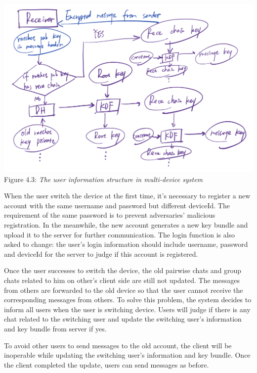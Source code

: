 \begin{enumerate}[label=(\roman*)]
\begin{center}
\includegraphics[scale=.5]{../3-Background/resources/DH-rece.png}\\
Figure 4.3: \textit{The user information structure in multi-device system}
\end{center}

When the user switch the device at the first time, it's necessary to register a new account with the same username and password but different deviceId. The requirement of the same password is to prevent adversaries' malicious registration. In the meanwhile, the new account generates a new key bundle and upload it to the server for further communication. The login function is also asked to change: the user's login information should include username, password and deviceId for the server to judge if this account is registered.

Once the user successes to switch the device, the old pairwise chats and group chats related to him on other's client side are still not updated. The messages from others are forwarded to the old device so that the user cannot receive the corresponding messages from others. To solve this problem, the system decides to inform all users when the user is switching device. Users will judge if there is any chat related to the switching user and update the switching user's information and key bundle from server if yes.

To avoid other users to send messages to the old account, the client will be inoperable while updating the switching user's information and key bundle. Once the client completed the update, users can send messages as before.


\end{enumerate}

